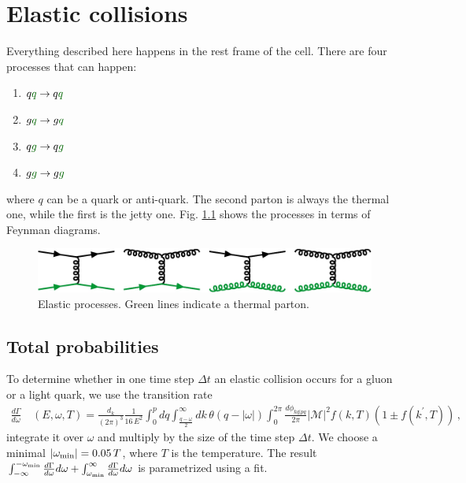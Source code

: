 \chapter{Elastic collisions}
\label{elastic}
Everything described here happens in the rest frame of the cell.
There are four processes that can happen:
\begin{enumerate}
\item $q\color{forest-green}q\color{black} 
  \rightarrow q\color{forest-green}q\color{black}$
\item $g\color{forest-green}q\color{black} 
  \rightarrow g\color{forest-green}q\color{black}$
\item $q\color{forest-green}g\color{black} 
  \rightarrow q\color{forest-green}g\color{black}$
\item $g\color{forest-green}g\color{black} 
  \rightarrow g\color{forest-green}g\color{black}$
\end{enumerate}
where $q$ can be a quark or anti-quark. The second parton is always the thermal one,
while the first is the jetty one. Fig. \ref{fig:feynmanelasitc} shows 
the processes in terms of Feynman diagrams.
\begin{figure}[htb]
  \begin{center}
    \includegraphics[width=16cm]{feynmanelastic.jpg}
    \caption{Elastic processes. Green lines indicate a thermal parton. 
      \label{fig:feynmanelasitc}}
  \end{center}
\end{figure}


\section{Total probabilities}
To determine whether in one time step $\Delta t$ an elastic collision
occurs for a gluon or a light quark, we use the transition rate
\begin{align}\label{transition}
 \frac{d\Gamma}{d\omega}~&(E,\omega,T)=\frac{d_k}{(2\pi)^3}\frac{1}{16\,E^2}\int_0^p dq \int_{\frac{q-\omega}{2}}^\infty dk\,\theta(q-|\omega|)\int_0^{2\pi}\frac{d\phi_{kq|pq}}{2\pi}|\mathcal{M}|^2 f(k,T)(1\pm f(k^\prime,T))\,,
\end{align}
integrate it over $\omega$ and multiply by the size of the time step $\Delta t$.
We choose a minimal $|\omega_{\rm min}|=0.05\,T$, where $T$ is the temperature.
The result $\int_{-\infty}^{-\omega_{\rm min}}\frac{d\Gamma}{d\omega} d\omega+\int_{\omega_{\rm min}}^{\infty}\frac{d\Gamma}{d\omega} d\omega$ is parametrized using a fit.

